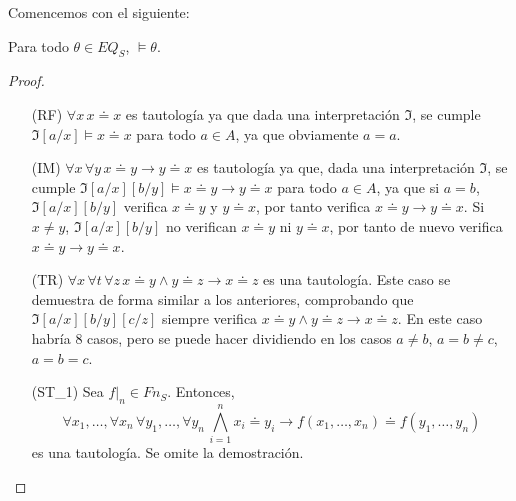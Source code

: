 Comencemos con el siguiente:

\begin{lema}\label{eq}
Para todo $\theta \in EQ_S$, $\vDash \theta$. 
\end{lema}
\begin{proof} \mbox{}
\begin{itemize}
        \item[(RF)] $\forall x \, x \doteq x$ es tautología ya que dada una interpretación $\mathfrak{I}$, se cumple $\mathfrak{I}[a/x] \vDash x \doteq x$ para todo $a \in A$, ya que obviamente $a=a$.
        \item[(IM)] $\forall x \, \forall y \, x \doteq y \rightarrow y \doteq x$ es tautología ya que, dada una interpretación $\mathfrak{I}$, se cumple $\mathfrak{I}[a/x][b/y] \vDash x \doteq y \rightarrow y \doteq x$ para todo $a \in A$, ya que si $a=b$, $\mathfrak{I}[a/x][b/y]$ verifica $x \doteq y$ y $y \doteq x$, por tanto verifica $x \doteq y \rightarrow y \doteq x$. Si $x\neq y$, $\mathfrak{I}[a/x][b/y]$ no verifican $x \doteq y$ ni $y \doteq x$, por tanto de nuevo verifica $x \doteq y \rightarrow y \doteq x$.
        \item[(TR)] $\forall x \, \forall t \, \forall z \, x \doteq y \land y \doteq z \rightarrow x \doteq z$ es una tautología. Este caso se demuestra de forma similar a los anteriores, comprobando que $\mathfrak{I}[a/x][b/y][c/z]$ siempre verifica $x \doteq y \land y \doteq z \rightarrow x \doteq z$. En este caso habría 8 casos, pero se puede hacer dividiendo en los casos $a\neq b$, $a=b\neq c$, $a=b=c$.
        \item[(ST_{1})] Sea $f|_n \in Fn_S$. Entonces, $$\forall x_1, \dots, \forall x_n \, \forall y_1, \dots, \forall y_n \, \bigwedge\limits_{i = 1}^{n} x_i \doteq y_i \rightarrow f(x_1, \dots, x_n) \doteq f(y_1, \dots, y_n)$$ es una tautología. Se omite la demostración.

\end{itemize}
\end{proof}
